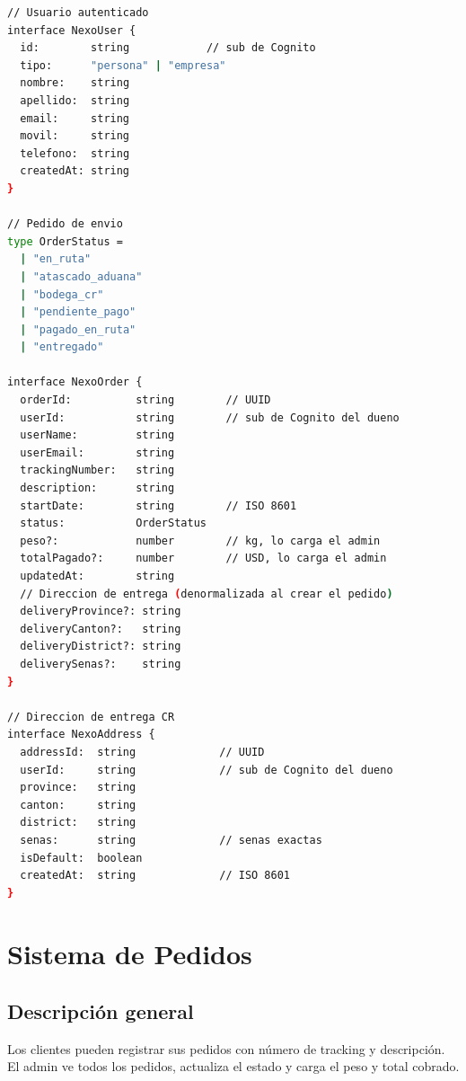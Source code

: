 \documentclass[12pt,a4paper]{article}
\begin{document}
\begin{lstlisting}[language=bash, caption={Tipos del dominio principal}]
// Usuario autenticado
interface NexoUser {
  id:        string            // sub de Cognito
  tipo:      "persona" | "empresa"
  nombre:    string
  apellido:  string
  email:     string
  movil:     string
  telefono:  string
  createdAt: string
}

// Pedido de envio
type OrderStatus =
  | "en_ruta"
  | "atascado_aduana"
  | "bodega_cr"
  | "pendiente_pago"
  | "pagado_en_ruta"
  | "entregado"

interface NexoOrder {
  orderId:          string        // UUID
  userId:           string        // sub de Cognito del dueno
  userName:         string
  userEmail:        string
  trackingNumber:   string
  description:      string
  startDate:        string        // ISO 8601
  status:           OrderStatus
  peso?:            number        // kg, lo carga el admin
  totalPagado?:     number        // USD, lo carga el admin
  updatedAt:        string
  // Direccion de entrega (denormalizada al crear el pedido)
  deliveryProvince?: string
  deliveryCanton?:   string
  deliveryDistrict?: string
  deliverySenas?:    string
}

// Direccion de entrega CR
interface NexoAddress {
  addressId:  string             // UUID
  userId:     string             // sub de Cognito del dueno
  province:   string
  canton:     string
  district:   string
  senas:      string             // senas exactas
  isDefault:  boolean
  createdAt:  string             // ISO 8601
}
\end{lstlisting}

\section{Sistema de Pedidos}

\subsection{Descripción general}

Los clientes pueden registrar sus pedidos con número de tracking y descripción.
El admin ve todos los pedidos, actualiza el estado y carga el peso y total cobrado.
\end{document}
